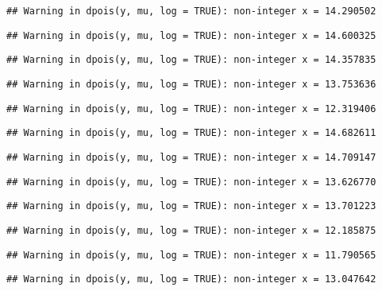 \documentclass[
]{article}
\begin{document}
\begin{verbatim}
## Warning in dpois(y, mu, log = TRUE): non-integer x = 14.290502
\end{verbatim}

\begin{verbatim}
## Warning in dpois(y, mu, log = TRUE): non-integer x = 14.600325
\end{verbatim}

\begin{verbatim}
## Warning in dpois(y, mu, log = TRUE): non-integer x = 14.357835
\end{verbatim}

\begin{verbatim}
## Warning in dpois(y, mu, log = TRUE): non-integer x = 13.753636
\end{verbatim}

\begin{verbatim}
## Warning in dpois(y, mu, log = TRUE): non-integer x = 12.319406
\end{verbatim}

\begin{verbatim}
## Warning in dpois(y, mu, log = TRUE): non-integer x = 14.682611
\end{verbatim}

\begin{verbatim}
## Warning in dpois(y, mu, log = TRUE): non-integer x = 14.709147
\end{verbatim}

\begin{verbatim}
## Warning in dpois(y, mu, log = TRUE): non-integer x = 13.626770
\end{verbatim}

\begin{verbatim}
## Warning in dpois(y, mu, log = TRUE): non-integer x = 13.701223
\end{verbatim}

\begin{verbatim}
## Warning in dpois(y, mu, log = TRUE): non-integer x = 12.185875
\end{verbatim}

\begin{verbatim}
## Warning in dpois(y, mu, log = TRUE): non-integer x = 11.790565
\end{verbatim}

\begin{verbatim}
## Warning in dpois(y, mu, log = TRUE): non-integer x = 13.047642
\end{verbatim}
\end{document}
